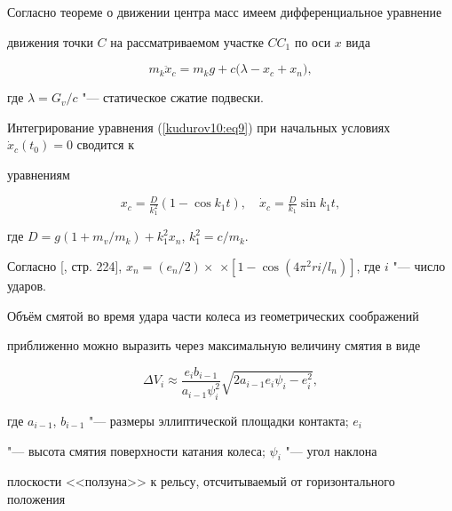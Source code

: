 Согласно теореме о движении центра масс имеем дифференциальное уравнение

движения точки $C$ на рассматриваемом участке $CC_1 $ по оси $x$ вида

\begin{equation}

\label{kudurov10:eq9}

m_k \ddot {x}_c =m_k g + c\bigl( \lambda  - x_c + x_n \bigr),

\end{equation}

где $\lambda  = {G_v}/{c}$ "--- статическое сжатие подвески.



Интегрирование уравнения (\ref{kudurov10:eq9}) при начальных условиях $\dot {x}_c ( t_0  )=0$ сводится к

уравнениям

\begin{equation}

\label{kudurov10:eq10}

x_c =\tfrac{D}{k_1^2}\left( 1-\cos k_1 t \right), \quad \dot {x}_c =\tfrac{D}{k_1}\sin k_1 t,

\end{equation}

где $D = g\left( 1+{m_v}/{m_k} \right) + k_1^2 x_n$, $k_1^2 ={c}/{m_k}$.

Согласно [, стр. 224], $x_n =({e_n}/{2})\times $ $\times \left[ 1-\cos \left(

{4 \pi^2r}i/{l_n} \right) \right]$, где $i$ "--- число ударов.



Объём смятой во время удара части колеса из геометрических соображений

приближенно можно выразить через максимальную величину смятия в виде

\begin{equation}

\label{kudurov10:eq11}

\Delta V_i \approx \frac{e_i b_{i-1} }{a_{i-1} \psi_i^2}\sqrt {2a_{i-1} e_i \psi_i -e_i^2},

\end{equation}

где $a_{i-1}$, $b_{i-1}$ "--- размеры эллиптической площадки контакта; $e_i$

"--- высота смятия поверхности катания колеса; $\psi_i$ "--- угол наклона

плоскости <<ползуна>> к рельсу, отсчитываемый от горизонтального положения

